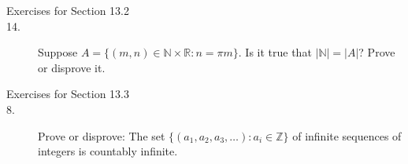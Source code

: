 \documentclass{article}
\begin{document}
\begin{description}
\item[Exercises for Section 13.2]
\item[14.]  Suppose $A=\{(m,n)\in\mathbb{N}\times\mathbb{R}: n = \pi m\}$.
  Is it true that $|\mathbb{N}| = |A|$?  Prove or disprove it.


\item[Exercises for Section 13.3]
\item[8.] Prove or disprove:  The set
  $\{(a_1,a_2,a_3,\ldots):a_i\in\mathbb{Z}\}$ of
  infinite sequences of integers is countably infinite.
  

\end{description}
\end{document}
